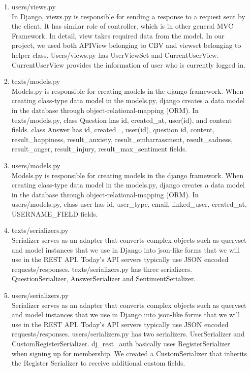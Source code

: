 \documentclass[conference]{IEEEtran}
\begin{document}
\begin{enumerate}
\begin{enumerate}
\begin{enumerate}
            \newline
            \item users/views.py
            \\In Django, views.py is responsible for sending a response to a request sent by the client. It has similar role of controller, which is in other general MVC Framework. In detail, view takes required data from the model. In our project, we used both APIView belonging to CBV and viewset belonging to helper class. Users/views.py has UserViewSet and CurrentUserView. CurrentUserView provides the information of user who is currently logged in.\newline

            \item texts/models.py
            \\Models.py is responsible for creating models in the django framework. When creating class-type data model in the models.py, django creates a data model in the database through object-relational-mapping (ORM). In texts/models.py, class Question has id, created\_at, user(id), and content fields. class Answer has id, created\_, user(id), question id, content, result\_happiness, result\_anxiety, result\_embarrassment, result\_sadness, result\_anger, result\_injury, result\_max\_sentiment fields.
            \newline
            \item users/models.py
            \\Models.py is responsible for creating models in the django framework. When creating class-type data model in the models.py, django creates a data model in the database through object-relational-mapping (ORM). In users/models.py, class user has id, user\_type, email, linked\_user, created\_at, USERNAME\_FIELD fields.
            \newline
            \item texts/serializers.py
            \\Serializer serves as an adapter that converts complex objects such as queryset and model instances that we use in Django into json-like forms that we will use in the REST API. Today's API servers typically use JSON encoded requests/responses. texts/serializers.py has three serializers. QuestionSerializer, AnswerSerializer and SentimentSerializer.
            \newline
            \item users/serializers.py
            \\Serializer serves as an adapter that converts complex objects such as queryset and model instances that we use in Django into json-like forms that we will use in the REST API. Today's API servers typically use JSON encoded requests/responses. users/serializers.py has two serializers. UserSerializer and CustomRegisterSerializer. dj\_rest\_auth basically uses RegisterSerializer when signing up for membership. We created a CustomSerializer that inherits the Register Serializer to receive additional custom fields.

\end{enumerate}
\end{enumerate}
\end{enumerate}
\end{document}
